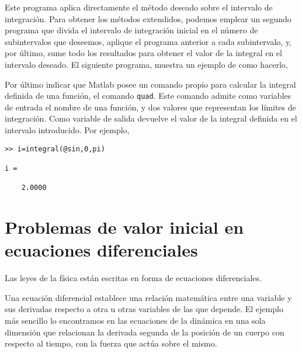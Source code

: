 Este programa aplica directamente el método deseado sobre el intervalo de integración. Para obtener los métodos extendidos, podemos emplear un segundo programa que divida el intervalo de integración inicial en el número de subintervalos que deseemos, aplique el programa anterior a cada subintervalo, y, por último, sume todo los resultados para obtener el valor de la integral en el intervalo deseado. El siguiente programa, muestra un ejemplo de como hacerlo,


Por último indicar que Matlab posee un comando propio para calcular la integral definida de una función, el comando \texttt{quad}. Este comando admite como variables de entrada el nombre de una función, y dos valores que representan los límites de integración. Como variable de salida devuelve el valor de la integral definida en el intervalo introducido. Por ejemplo,

\begin{verbatim}
>> i=integral(@sin,0,pi)

i =

    2.0000
\end{verbatim}


\section{Problemas de valor inicial en ecuaciones diferenciales}
Las leyes de la física están escritas en forma de ecuaciones diferenciales.  

Una ecuación diferencial establece una relación matemática entre una variable y sus derivadas respecto a otra u otras variables de las que depende. El ejemplo más sencillo lo encontramos en las ecuaciones de la dinámica en una sola dimensión que relacionan la derivada segunda de la posición de un cuerpo con respecto al tiempo, con la fuerza que actúa sobre el mismo.

